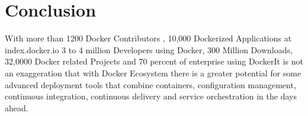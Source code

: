 \documentclass[9pt,twocolumn,twoside]{styles/osajnl}
\begin{document}
\section{Conclusion}

\cite{www-docker-3}With more than 1200 Docker Contributors , 10,000 Dockerized
Applications at index.docker.io 3 to 4 million Developers using
Docker, 300 Million Downloads, 32,0000 Docker related Projects and 70
percent of enterprise using DockerIt is not an exaggeration that with
Docker Ecosystem there is a greater potential for some advanced
deployment tools that combine containers, configuration management,
continuous integration, continuous delivery and service orchestration
in the days ahead.



\end{document}
